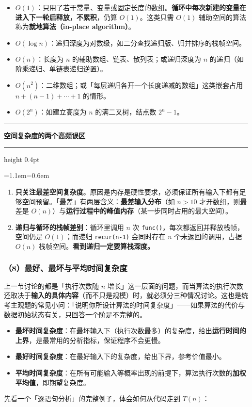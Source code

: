 \documentclass[11pt,openany,UTF8]{ctexbook}
\newcommand{\callouthead}[2]{%
  \par\addvspace{7pt}\noindent
  {\color{#1}\rule[-0.15em]{3pt}{1.05em}}\hspace{0.5em}%
  {\bfseries\color{#1}#2}\par\nobreak\vspace{-0.35em}%
  {\color{rulesep}\hrule height 0.4pt}\nobreak\vspace{0.45em}%
  \begingroup\small\setlength{\parindent}{0pt}%
  \leftskip=1.1em\rightskip=0.6em\noindent\ignorespaces}
\newcommand{\calloutend}{\par\endgroup\addvspace{7pt}}
\newenvironment{callwarn}[1]{\callouthead{warnbar}{#1}}{\calloutend}
\begin{document}
\begin{itemize}
\item $O(1)$：只用了若干常量、变量或固定长度的数组。\textbf{循环中每次新建的变量在进入下一轮后释放，不累积}，仍算 $O(1)$。这类只需 $O(1)$ 辅助空间的算法称为\textbf{就地算法（in-place algorithm）}。
\item $O(\log n)$：递归深度为对数级，如二分查找递归版、归并排序的栈帧空间。
\item $O(n)$：长度为 $n$ 的辅助数组、链表、散列表；或递归深度为 $n$ 的递归（如阶乘递归、单链表递归逆置）。
\item $O(n^2)$：二维数组；或「每层递归各开一个长度递减的数组」这类嵌套占用 $n+(n-1)+\cdots+1$ 的情形。
\item $O(2^n)$：如建立高度为 $n$ 的满二叉树，结点数 $2^{n}-1$。
\end{itemize}
\begin{callwarn}{空间复杂度的两个高频误区}
\begin{enumerate}
\item \textbf{只关注最差空间复杂度}。原因是内存是硬性要求，必须保证所有输入下都有足够空间预留。「最差」有两层含义：\textbf{最差输入分布}（如 $n>10$ 才开数组，则最差是 $O(n)$）与\textbf{运行过程中的峰值内存}（某一步同时占用的最大空间）。
\item \textbf{递归与循环的栈帧差别}：循环里调用 $n$ 次 \texttt{func()\allowbreak{}}，每次都返回并释放栈帧，空间仍是 $O(1)$；而递归 \texttt{recur(n-1)\allowbreak{}} 会同时存在 $n$ 个未返回的调用，占据 $O(n)$ 栈帧空间。\textbf{看到递归一定要算栈深度。}
\end{enumerate}
\end{callwarn}

\subsubsection{（8）最好、最坏与平均时间复杂度}

上一节讨论的都是「执行次数随 $n$ 增长」这一层面的问题，而当算法的执行次数还取决于\textbf{输入的具体内容}（而不只是规模）时，就必须分三种情况讨论。这也是统考主观题的常见小问：「说明你所设计算法的时间复杂度」——如果算法的代价与数据初始状态有关，只回答一个阶是不完整的。

\begin{itemize}
\item \textbf{最坏时间复杂度}：在最坏输入下（执行次数最多）的复杂度，给出\textbf{运行时间的上界}，是最常用的分析指标，保证程序不会更慢。
\item \textbf{最好时间复杂度}：在最好输入下的复杂度，给出下界，参考价值最小。
\item \textbf{平均时间复杂度}：在所有可能输入等概率出现的前提下，算法执行次数的\textbf{加权平均值}，即期望复杂度。
\end{itemize}
先看一个「逐语句分析」的完整例子，体会如何从代码走到 $T(n)$：
\end{document}
